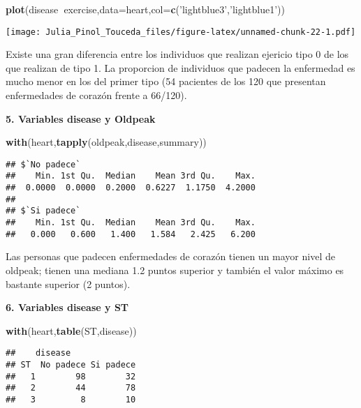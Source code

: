 \documentclass[]{article}
\newenvironment{Shaded}{\begin{snugshade}}{\end{snugshade}}
\newcommand{\KeywordTok}[1]{\textcolor[rgb]{0.13,0.29,0.53}{\textbf{#1}}}
\newcommand{\DataTypeTok}[1]{\textcolor[rgb]{0.13,0.29,0.53}{#1}}
\newcommand{\StringTok}[1]{\textcolor[rgb]{0.31,0.60,0.02}{#1}}
\newcommand{\OperatorTok}[1]{\textcolor[rgb]{0.81,0.36,0.00}{\textbf{#1}}}
\newcommand{\NormalTok}[1]{#1}
\begin{document}
\begin{Shaded}
\begin{Highlighting}[]
\KeywordTok{plot}\NormalTok{(disease}\OperatorTok{~}\NormalTok{exercise,}\DataTypeTok{data=}\NormalTok{heart,}\DataTypeTok{col=}\KeywordTok{c}\NormalTok{(}\StringTok{'lightblue3'}\NormalTok{,}\StringTok{'lightblue1'}\NormalTok{))}
\end{Highlighting}
\end{Shaded}

\texttt{[image: Julia\_Pinol\_Touceda\_files/figure-latex/unnamed-chunk-22-1.pdf]}

Existe una gran diferencia entre los individuos que realizan ejericio
tipo 0 de los que realizan de tipo 1. La proporcion de individuos que
padecen la enfermedad es mucho menor en los del primer tipo (54
pacientes de los 120 que presentan enfermedades de corazón frente a
66/120).

\textbf{5. Variables disease y Oldpeak}

\begin{Shaded}
\begin{Highlighting}[]
\KeywordTok{with}\NormalTok{(heart,}\KeywordTok{tapply}\NormalTok{(oldpeak,disease,summary)) }
\end{Highlighting}
\end{Shaded}

\begin{verbatim}
## $`No padece`
##    Min. 1st Qu.  Median    Mean 3rd Qu.    Max. 
##  0.0000  0.0000  0.2000  0.6227  1.1750  4.2000 
## 
## $`Si padece`
##    Min. 1st Qu.  Median    Mean 3rd Qu.    Max. 
##   0.000   0.600   1.400   1.584   2.425   6.200
\end{verbatim}

Las personas que padecen enfermedades de corazón tienen un mayor nivel
de oldpeak; tienen una mediana 1.2 puntos superior y también el valor
máximo es bastante superior (2 puntos).

\textbf{6. Variables disease y ST}

\begin{Shaded}
\begin{Highlighting}[]
\KeywordTok{with}\NormalTok{(heart,}\KeywordTok{table}\NormalTok{(ST,disease)) }
\end{Highlighting}
\end{Shaded}

\begin{verbatim}
##    disease
## ST  No padece Si padece
##   1        98        32
##   2        44        78
##   3         8        10
\end{verbatim}
\end{document}
